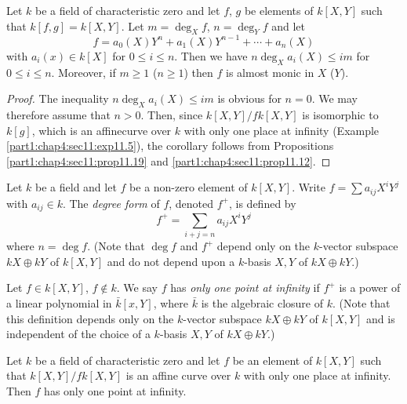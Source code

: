 \begin{coro}\label{part1:chap4:sec11:coro11.20}
  Let $k$ be a field of characteristic zero and let $f$, $g$ be
  elements of $k[X, Y]$ such that $k[f, g]= k[X, Y]$. Let $m= \deg_X
  f$, $n = \deg_Y f$ and let 
  $$
  f= a_0 (X) Y^n + a_1 (X) Y^{n-1}+ \cdots + a_n (X)
  $$
  with $a_i (x) \in k [X]$ for $0 \leq i \leq n$. Then we have $n
  \deg_X a_i (X) \leq im$ for $0 \leq i \leq n$. Moreover, if $m \geq
  1$ (\resp $n \geq 1$) then $f$ is almost monic in $X$ (\resp $Y$).
\end{coro}

\begin{proof}
  The inequality $n \deg_X a_i (X) \leq im$ is obvious for $n=0$. We
  may therefore assume that $n >0$. Then, since $k[X, Y]/fk[X, Y]$ is
  isomorphic to $k[g]$, which is an affine\pageoriginale curve over $k$ with only one place at infinity (Example \ref{part1:chap4:sec11:exp11.5}), the corollary follows from Propositions \ref{part1:chap4:sec11:prop11.19} and \ref{part1:chap4:sec11:prop11.12}. 
\end{proof}

\begin{defi}\label{part1:chap4:sec11:def11.21}
Let $k$ be a field and let $f$ be a non-zero element of $k[X,Y]$. Write $f = \sum a_{ij} X^i Y^j$ with $a_{ij} \in k$. The {\em degree form} of $f$, denoted $f^+$, is defined by
$$
f^+ = \sum\limits_{i+j=n} a_{ij} X^i Y^j
$$
where $n = \deg f$. (Note that $\deg f$ and $f^+$ depend only on the $k$-vector subspace $kX \oplus kY $ of $k[X,Y]$ and do not depend upon a $k$-basis $X,Y$ of $kX \oplus kY$.)
\end{defi}

\begin{defi}\label{part1:chap4:sec11:def11.22}
Let $f\in k [X,Y]$, $f \not\in k$. We say $f$ has {\em only one point at infinity} if $f^+$ is a power of a linear polynomial in $\bar{k}[x,Y]$, where $\bar{k}$ is the algebraic closure of $k$. (Note that this definition depends only on the $k$-vector subspace $kX \oplus k Y$ of $k[X,Y]$ and is independent of the choice of a $k$-basis $X,Y$ of $kX \oplus k Y$.)
\end{defi}

\begin{prop}\label{part1:chap4:sec11:prop11.23}
Let $k$ be a field of characteristic zero and let $f$ be an element of $k[X,Y]$ such that $k[X,Y]/fk[X,Y]$ is an affine curve over $k$ with only one place at infinity. Then $f$ has only one point at infinity.
\end{prop}

